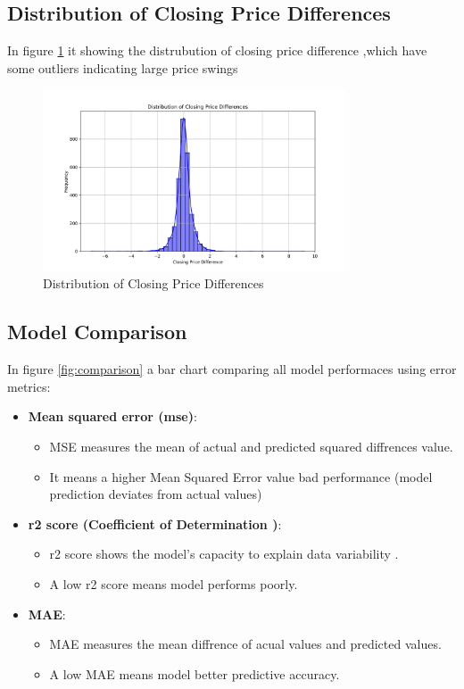 \subsection{Distribution of Closing Price Differences}
In figure \ref{fig:dist} it showing the distrubution of closing price difference ,which have some outliers indicating large price swings

\begin{figure}[h]
    \centering
    \includegraphics[width=0.8\textwidth]{./figures_amit/distribution_closing_price_diff.png}
    \caption{Distribution of Closing Price Differences}
    \label{fig:dist}
\end{figure}

\subsection{Model Comparison}
In figure \ref{fig:comparison} a bar chart comparing all model performaces using error metrics:
\begin{itemize}
    \item \textbf{Mean squared error (mse)}:
        \begin{itemize}
        \item MSE measures the mean of actual and predicted squared diffrences value.
        \item It means a higher Mean Squared Error value  bad performance (model prediction deviates from actual values)
        \end{itemize}
    \item \textbf{r2 score (Coefficient of Determination )}:
    \begin{itemize}
    
        \item r2 score shows the model's capacity to explain data variability .
        \item A low r2 score means model performs poorly. 
    \end{itemize}
    \item \textbf{MAE}:
        \begin{itemize}

        \item MAE measures the mean diffrence of acual values and predicted values.
        \item A low MAE means model better predictive accuracy. 
        \end{itemize}
\end{itemize}

